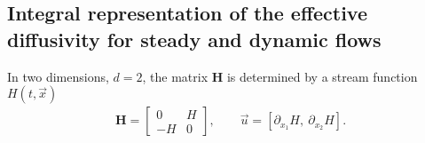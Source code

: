 \documentclass[11pt]{amsart}
\newcommand{\Hb}{\mathbf{H}}
\begin{document}
\subsection{Integral representation of the effective diffusivity for
  steady and dynamic flows}\label{sec:Integral_Rep}
%





In two dimensions, $d=2$, the matrix $\Hb$ is determined by a stream
function $H(t,\vec{x})$ 
%
\begin{align}\label{eq:u_H}  
  \Hb=\left[
  \begin{array}{cc}
    0  & H\\
    -H & 0
  \end{array}
  \right],
  \qquad
  \vec{u}=[\partial_{x_1}H, \ \partial_{x_2}H].
\end{align}
%
\end{document}
